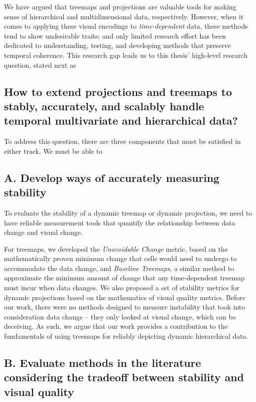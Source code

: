We have argued that treemaps and projections are valuable tools for making sense of hierarchical and multidimensional data, respectively. However, when it comes to applying these visual encodings to \emph{time-dependent} data, these methods tend to show undesirable traits; and only limited research effort has been dedicated to understanding, testing, and developing methods that preserve temporal coherence. This research gap leads us to this thesis' high-level research question, stated next as

\subsection*{How to extend projections and treemaps to stably, accurately, and scalably handle temporal multivariate and hierarchical data?}

To address this question, there are three components that must be satisfied in either track. We must be able to

\subsection*{A. Develop ways of accurately measuring stability}

To evaluate the stability of a dynamic treemap or dynamic projection, we need to have reliable measurement tools that quantify the relationship between data change and visual change.

For treemaps, we developed the \emph{Unavoidable Change} metric, based on the mathematically proven minimum change that cells would need to undergo to accommodate the data change, and \emph{Baseline Treemaps}, a similar method to approximate the minimum amount of change that any time-dependent treemap must incur when data changes. We also proposed a set of stability metrics for dynamic projections based on the mathematics of visual quality metrics.
Before our work, there were no methods designed to measure instability that took into consideration data change -- they only looked at visual change, which can be deceiving. As such, we argue that our work provides a contribution to the fundamentals of using treemaps for reliably depicting dynamic hierarchical data.

\subsection*{B. Evaluate methods in the literature considering the tradeoff between stability and visual quality}

